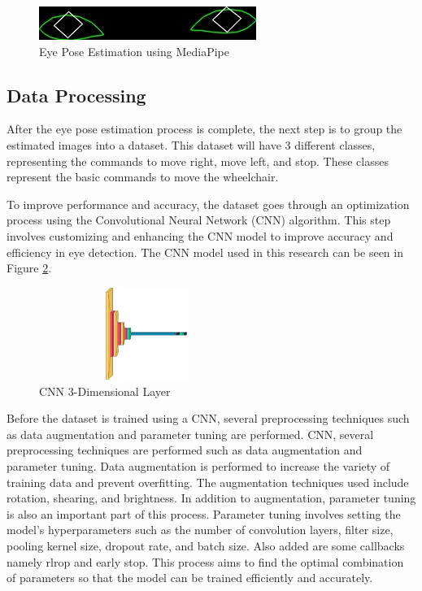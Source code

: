 \begin{figure} [ht] \centering
  \includegraphics[scale=0.55]{gambar/bab4/30.jpg}
  \caption{Eye Pose Estimation using MediaPipe}
  \label{fig:estimasi}
\end{figure}

\subsection{Data Processing}

After the eye pose estimation process is complete, the next step is to group the estimated images into a dataset. This dataset will have 3 different classes, representing the commands to move right, move left, and stop. These classes represent the basic commands to move the wheelchair. 

To improve performance and accuracy, the dataset goes through an optimization process using the Convolutional Neural Network (CNN) algorithm. This step involves customizing and enhancing the CNN model to improve accuracy and efficiency in eye detection. The CNN model used in this research can be seen in Figure \ref{fig:3dlayer}.

\begin{figure} [ht] \centering
  \includegraphics[height=3cm ,width=7cm]{gambar/bab3/3dlayer.png}
  \caption{CNN 3-Dimensional Layer}
  \label{fig:3dlayer}
\end{figure}

Before the dataset is trained using a CNN, several preprocessing techniques such as data augmentation and parameter tuning are performed. CNN, several preprocessing techniques are performed such as data augmentation and parameter tuning. Data augmentation is performed to increase the variety of training data and prevent overfitting. The augmentation techniques used include rotation, shearing, and brightness. In addition to augmentation, parameter tuning is also an important part of this process. Parameter tuning involves setting the model's hyperparameters such as the number of convolution layers, filter size, pooling kernel size, dropout rate, and batch size. Also added are some callbacks namely rlrop and early stop. This process aims to find the optimal combination of parameters so that the model can be trained efficiently and accurately.

